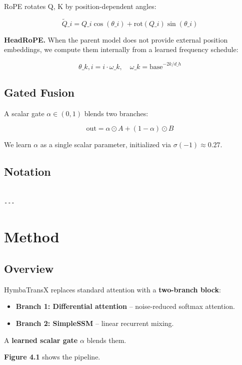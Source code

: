 RoPE rotates Q, K by position-dependent angles:

\[
\tilde{Q}\_i = Q\_i \cos(\theta\_i) + \text{rot}(Q\_i) \sin(\theta\_i)
\tag{3.6}
\]

\textbf{HeadRoPE.} When the parent model does not provide external position 
embeddings, we compute them internally from a learned frequency schedule:

\[
\theta\_{k, i} = i \cdot \omega\_k, \quad
\omega\_k = \text{base}^{-2k / d\_h}
\tag{3.7}
\]

\subsection{Gated Fusion}

A scalar gate $\alpha \in (0, 1)$ blends two branches:

\[
\text{out} = \alpha \odot A + (1 - \alpha) \odot B
\tag{3.8}
\]

We learn $\alpha$ as a single scalar parameter, initialized via 
$\sigma(-1) \approx 0.27$.

\subsection{Notation}

\begin{lstlisting}

---
\end{lstlisting}

\section{Method}

\subsection{Overview}

HymbaTransX replaces standard attention with a \textbf{two-branch block}:

\begin{itemize}
\item \textbf{Branch 1: Differential attention} -- noise-reduced softmax attention.
\item \textbf{Branch 2: SimpleSSM} -- linear recurrent mixing.

\end{itemize}
A \textbf{learned scalar gate} $\alpha$ blends them.

\textbf{Figure 4.1} shows the pipeline.


